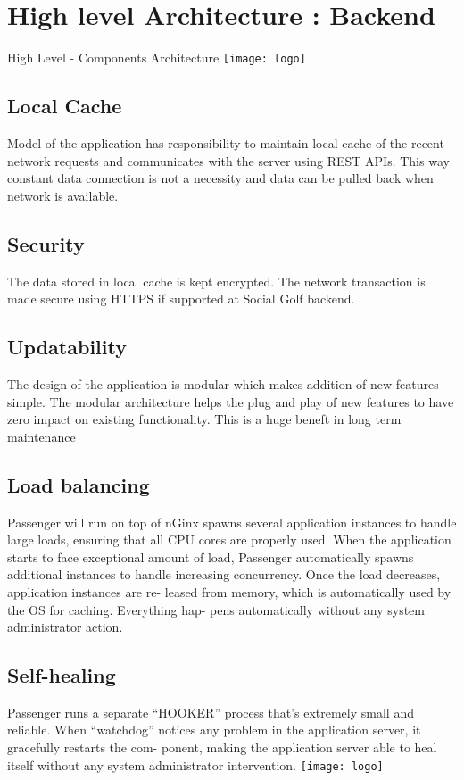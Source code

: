 \documentclass[12pt]{article}
\begin{document}
\section{High level Architecture : Backend}
\small High Level - Components Architecture
\texttt{[image: logo]}
\subsection{Local Cache}
Model of the application has responsibility to maintain local cache of the recent network requests and communicates with the server using REST APIs. This way constant data connection is not a necessity and data can be pulled back when network is available.
\subsection{Security}
The data stored in local cache is kept encrypted. The network transaction is made secure using HTTPS if supported at Social Golf backend.
\subsection{Updatability}
The design of the application is modular which makes addition of new features simple. The modular architecture helps the plug and play of new features to have zero impact on existing functionality. This is a huge beneft in long term maintenance
\subsection{Load balancing}
Passenger will run on top of nGinx spawns several application instances to handle large loads, ensuring that all CPU cores are properly used. When the application starts to face exceptional amount of load, Passenger automatically spawns additional instances to handle increasing concurrency. Once the load decreases, application instances are re- leased from memory, which is automatically used by the OS for caching. Everything hap- pens automatically without any system administrator action.
\subsection{Self-healing}
Passenger runs a separate “HOOKER” process that’s extremely small and reliable. When “watchdog” notices any problem in the application server, it gracefully restarts the com- ponent, making the application server able to heal itself without any system administrator intervention.
\texttt{[image: logo]}
\end{document}
